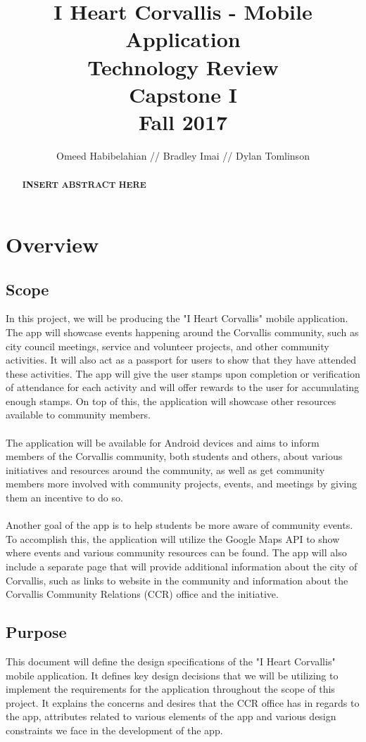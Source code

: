 \documentclass[draftclsnofoot, onecolumn, 10pt, compsoc]{IEEEtran}
\title{\textbf{I Heart Corvallis - Mobile Application\\Technology Review}\\Capstone I\\Fall 2017}
\author{Omeed Habibelahian // Bradley Imai // Dylan Tomlinson}
\begin{document}
	\maketitle
	\begin{abstract}
		\textbf{INSERT ABSTRACT HERE}
	\end{abstract}
	\newpage
	
	\tableofcontents
	\newpage
	
	\section{Overview}
		\subsection{Scope}
			In this project, we will be producing the "I Heart Corvallis" mobile application. The app will showcase events happening around the Corvallis community, such as city council meetings, service and volunteer projects, and other community activities. It will also act as a passport for users to show that they have attended these activities. The app will give the user stamps upon completion or verification of attendance for each activity and will offer rewards to the user for accumulating enough stamps. On top of this, the application will showcase other resources available to community members. \\ \\
			The application will be available for Android devices and aims to inform members of the Corvallis community, both students and others, about various initiatives and resources around the community, as well as get community members more involved with community projects, events, and meetings by giving them an incentive to do so. \\ \\
			Another goal of the app is to help students be more aware of community events. To accomplish this, the application will utilize the Google Maps API to show where events and various community resources can be found. The app will also include a separate page that will provide additional information about the city of Corvallis, such as links to website in the community and information about the Corvallis Community Relations (CCR) office and the initiative.
		\subsection{Purpose}
			This document will define the design specifications of the "I Heart Corvallis" mobile application. It defines key design decisions that we will be utilizing to implement the requirements for the application throughout the scope of this project. It explains the concerns and desires that the CCR office has in regards to the app, attributes related to various elements of the app and various design constraints we face in the development of the app.
\end{document}
